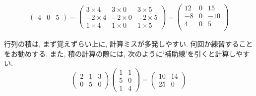 \begin{align*}
            \begin{pmatrix}
                4 & 0 & 5
            \end{pmatrix}
            =\begin{pmatrix}
                3 \times 4 & 3\times 0 & 3\times 5\\
                -2\times 4 & -2 \times 0 & -2 \times 5\\
                1 \times 4 & 1 \times 0 & 1 \times 5
            \end{pmatrix}
            =\begin{pmatrix}
                12 & 0 & 15 \\
                -8 & 0 & -10\\
                4  & 0 & 5  \\ 
            \end{pmatrix}
        \end{align*}

        行列の積は, まず覚えずらい上に, 計算ミスが多発しやすい. 何回か練習することをお勧めする. また, 積の計算の際には, 次のように`補助線'を引くと計算しやすい.
        \begin{equation*}
            \left(
            \begin{array}{ccc} 
                2 & 1 & 3 \\ \hline
                0 & 5 & 0 
            \end{array} 
            \right)
            \left(
            \begin{array}{c|c} 
            1 & 1\\
            5 & 0\\
            1 & 4 
            \end{array} 
            \right)
            =\begin{pmatrix}
                10 & 14\\
                25 & 0
            \end{pmatrix}
        \end{equation*}

